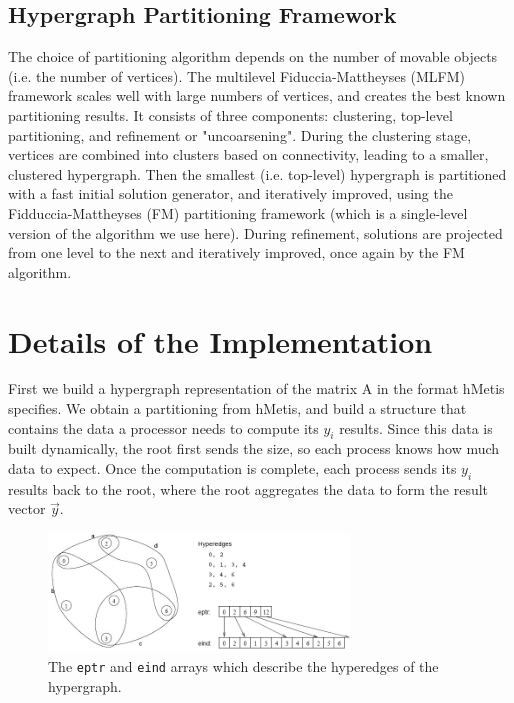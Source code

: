 \documentclass{article}
\begin{document}
\subsection{Hypergraph Partitioning Framework}

The choice of partitioning algorithm depends on the number of movable objects (i.e. the number of vertices). The multilevel Fiduccia-Mattheyses (MLFM) framework scales well with large numbers of vertices, and creates the best known partitioning results. It consists of three components: clustering, top-level partitioning, and refinement or "uncoarsening". During the clustering stage, vertices are combined into clusters based on connectivity, leading to a smaller, clustered hypergraph. Then the smallest (i.e. top-level) hypergraph is partitioned with a fast initial solution generator, and iteratively improved, using the Fidduccia-Mattheyses (FM) partitioning framework (which is a single-level version of the algorithm we use here). During refinement, solutions are projected from one level to the next and iteratively improved, once again by the FM algorithm.

\section{Details of the Implementation}

First we build a hypergraph representation of the matrix A in the format hMetis specifies. We obtain a partitioning from hMetis, and build a structure that contains the data a processor needs to compute its \(y_{i}\) results. Since this data is built dynamically, the root first sends the size, so each process knows how much data to expect. Once the computation is complete, each process sends its \(y_{i}\) results back to the root, where the root aggregates the data to form the result vector \(\vec{y}\).


\begin{figure}[htb]
\begin{center}
\mbox{\includegraphics[width=80mm]{hmetis.JPG}}
\end{center}
\caption{The \texttt{eptr} and \texttt{eind} arrays which describe the hyperedges of the hypergraph.}
\label{fig3}
\end{figure}
\end{document}
